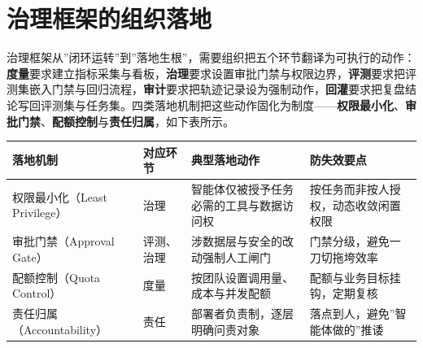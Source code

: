 \documentclass[
]{ctexbook}
\newcounter{none}
\begin{document}
\section{治理框架的组织落地}\label{ux6cbbux7406ux6846ux67b6ux7684ux7ec4ux7ec7ux843dux5730}

治理框架从''闭环运转''到''落地生根''，需要组织把五个环节翻译为可执行的动作：\textbf{度量}要求建立指标采集与看板，\textbf{治理}要求设置审批门禁与权限边界，\textbf{评测}要求把评测集嵌入门禁与回归流程，\textbf{审计}要求把轨迹记录设为强制动作，\textbf{回灌}要求把复盘结论写回评测集与任务集。四类落地机制把这些动作固化为制度------\textbf{权限最小化}、\textbf{审批门禁}、\textbf{配额控制}与\textbf{责任归属}，如下表所示。

{\def\LTcaptype{none} %
\begin{longtable}[]{@{}
  >{\raggedright\arraybackslash}p{}
  >{\raggedright\arraybackslash}p{}
  >{\raggedright\arraybackslash}p{}
  >{\raggedright\arraybackslash}p{}@{}}
\toprule\noalign{}
\begin{minipage}[b]{\linewidth}\raggedright
落地机制
\end{minipage} & \begin{minipage}[b]{\linewidth}\raggedright
对应环节
\end{minipage} & \begin{minipage}[b]{\linewidth}\raggedright
典型落地动作
\end{minipage} & \begin{minipage}[b]{\linewidth}\raggedright
防失效要点
\end{minipage} \\
\midrule\noalign{}
\endhead
\bottomrule\noalign{}
\endlastfoot
权限最小化（Least Privilege） & 治理 &
智能体仅被授予任务必需的工具与数据访问权 &
按任务而非按人授权，动态收敛闲置权限 \\
审批门禁（Approval Gate） & 评测、治理 &
涉数据层与安全的改动强制人工闸门 & 门禁分级，避免一刀切拖垮效率 \\
配额控制（Quota Control） & 度量 & 按团队设置调用量、成本与并发配额 &
配额与业务目标挂钩，定期复核 \\
责任归属（Accountability） & 责任 & 部署者负责制，逐层明确问责对象 &
落点到人，避免''智能体做的''推诿 \\
\end{longtable}
}
\end{document}
